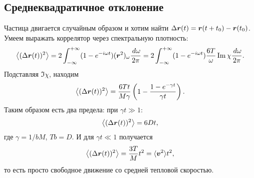 

\subsection{Среднеквадратичное отклонение}

Частица двигается случайным образом и хотим найти $\Delta \boldsymbol{r} (t) = \boldsymbol{r}(t+t_0) - \boldsymbol{r}(t_0)$. Умеем выражать коррелятор через спектральную плотность:
\begin{equation*}
	\left\langle (\Delta \boldsymbol{r}(t))^2\right\rangle = 
	2 \int_{-\infty}^{+\infty} (1-e^{-i \omega t}) (\boldsymbol{r}^2)_\omega \frac{\, d \omega}{2\pi}  = 2 \int_{-\infty}^{+\infty} 
	(1-e^{- i \omega t}) \frac{6T}{\omega} \mathop{\mathrm{Im}}\nolimits \chi
	\frac{\, d \omega}{2\pi}.
\end{equation*}
Подставляя $\Im \chi$, находим
\begin{equation*}
	\left\langle (\Delta \boldsymbol{r}(t))^2\right\rangle = \frac{6 T t}{M \gamma} \left(1 - \frac{1-e^{-\gamma t}}{\gamma t}\right).
\end{equation*}
Таким образом есть два предела: при $\gamma t \gg 1$:
\begin{equation*}
	\left\langle (\Delta \boldsymbol{r}(t))^2\right\rangle = 6 D t,
\end{equation*}
где $\gamma = 1/ bM$, $T b = D$.  И для $\gamma t \ll 1$ получается
\begin{equation*}
	\left\langle (\Delta \boldsymbol{r}(t))^2\right\rangle = \frac{3 T}{M} t^2 = \langle \boldsymbol{v}^2\rangle t^2,
\end{equation*}
то есть просто свободное движение со средней тепловой скоростью. 





